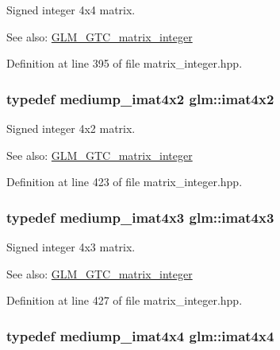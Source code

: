 Signed integer 4x4 matrix. \begin{Desc}
\item[See also:]\hyperlink{group__gtc__matrix__integer}{GLM\_\-GTC\_\-matrix\_\-integer} \end{Desc}


Definition at line 395 of file matrix\_\-integer.hpp.\hypertarget{group__gtc__matrix__integer_g7e733984837e0e7aa9f4aac18f632f63}{
\subsubsection[imat4x2]{\setlength{\rightskip}{0pt plus 5cm}typedef mediump\_\-imat4x2 {\bf glm::imat4x2}}}
\label{group__gtc__matrix__integer_g7e733984837e0e7aa9f4aac18f632f63}


Signed integer 4x2 matrix. \begin{Desc}
\item[See also:]\hyperlink{group__gtc__matrix__integer}{GLM\_\-GTC\_\-matrix\_\-integer} \end{Desc}


Definition at line 423 of file matrix\_\-integer.hpp.\hypertarget{group__gtc__matrix__integer_ga4cca8e80c0603239eda452860063844}{
\subsubsection[imat4x3]{\setlength{\rightskip}{0pt plus 5cm}typedef mediump\_\-imat4x3 {\bf glm::imat4x3}}}
\label{group__gtc__matrix__integer_ga4cca8e80c0603239eda452860063844}


Signed integer 4x3 matrix. \begin{Desc}
\item[See also:]\hyperlink{group__gtc__matrix__integer}{GLM\_\-GTC\_\-matrix\_\-integer} \end{Desc}


Definition at line 427 of file matrix\_\-integer.hpp.\hypertarget{group__gtc__matrix__integer_g367d8d5281ff82f1215a227dd2ea5ba9}{
\subsubsection[imat4x4]{\setlength{\rightskip}{0pt plus 5cm}typedef mediump\_\-imat4x4 {\bf glm::imat4x4}}}
\label{group__gtc__matrix__integer_g367d8d5281ff82f1215a227dd2ea5ba9}


